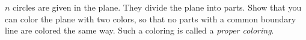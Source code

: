 $n$ circles are given in the plane. They divide the plane into parts. Show that you can color the plane with two colors, so that no parts with a common boundary line are colored the same way. Such a coloring is called a \emph{proper coloring}.
